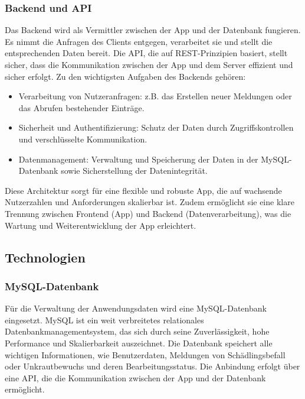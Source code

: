 \subsubsection{Backend und API}

Das Backend wird als Vermittler zwischen der App und der Datenbank fungieren. Es nimmt die Anfragen des Clients entgegen, verarbeitet sie und stellt die entsprechenden Daten bereit. Die API, die auf REST-Prinzipien basiert, stellt sicher, dass die Kommunikation zwischen der App und dem Server effizient und sicher erfolgt. Zu den wichtigsten Aufgaben des Backends gehören:

\begin{itemize}
    \item Verarbeitung von Nutzeranfragen: z.B. das Erstellen neuer Meldungen oder das Abrufen bestehender Einträge.
    \item Sicherheit und Authentifizierung: Schutz der Daten durch Zugriffskontrollen und verschlüsselte Kommunikation.
    \item Datenmanagement: Verwaltung und Speicherung der Daten in der MySQL-Datenbank sowie Sicherstellung der Datenintegrität.
\end{itemize}

Diese Architektur sorgt für eine flexible und robuste App, die auf wachsende Nutzerzahlen und Anforderungen skalierbar ist. Zudem ermöglicht sie eine klare Trennung zwischen Frontend (App) und Backend (Datenverarbeitung), was die Wartung und Weiterentwicklung der App erleichtert.

\subsection{Technologien}

\subsubsection{MySQL-Datenbank}

Für die Verwaltung der Anwendungsdaten wird eine MySQL-Datenbank eingesetzt. MySQL ist ein weit verbreitetes relationales Datenbankmanagementsystem, das sich durch seine Zuverlässigkeit, hohe Performance und Skalierbarkeit auszeichnet. Die Datenbank speichert alle wichtigen Informationen, wie Benutzerdaten, Meldungen von Schädlingsbefall oder Unkrautbewuchs und deren Bearbeitungsstatus. Die Anbindung erfolgt über eine API, die die Kommunikation zwischen der App und der Datenbank ermöglicht.

